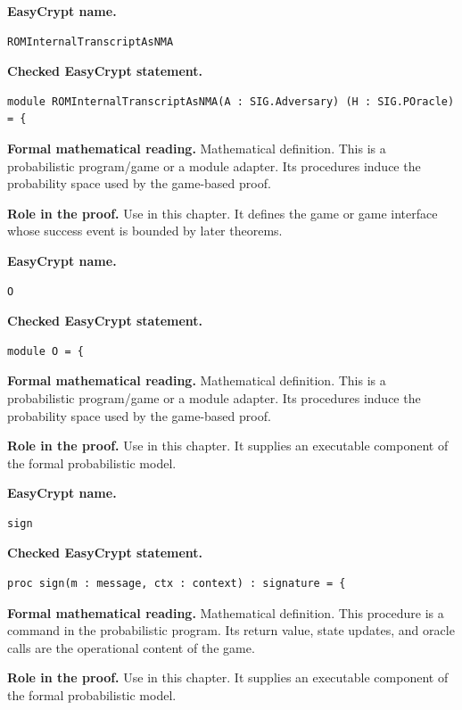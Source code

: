 \begin{formaldefinition}
\noindent\textbf{EasyCrypt name.}
\begin{lstlisting}[language=EasyCrypt,basicstyle=\ttfamily\scriptsize]
ROMInternalTranscriptAsNMA
\end{lstlisting}
\noindent\textbf{Checked EasyCrypt statement.}
\begin{lstlisting}[language=EasyCrypt,basicstyle=\ttfamily\scriptsize]
module ROMInternalTranscriptAsNMA(A : SIG.Adversary) (H : SIG.POracle) = {
\end{lstlisting}
\noindent\textbf{Formal mathematical reading.}
Mathematical definition. This is a probabilistic program/game or a module adapter.  Its procedures induce the probability space used by the game-based proof.

\noindent\textbf{Role in the proof.}
Use in this chapter. It defines the game or game interface whose success event is bounded by later theorems.

\end{formaldefinition}

\begin{formaldefinition}
\noindent\textbf{EasyCrypt name.}
\begin{lstlisting}[language=EasyCrypt,basicstyle=\ttfamily\scriptsize]
O
\end{lstlisting}
\noindent\textbf{Checked EasyCrypt statement.}
\begin{lstlisting}[language=EasyCrypt,basicstyle=\ttfamily\scriptsize]
module O = {
\end{lstlisting}
\noindent\textbf{Formal mathematical reading.}
Mathematical definition. This is a probabilistic program/game or a module adapter.  Its procedures induce the probability space used by the game-based proof.

\noindent\textbf{Role in the proof.}
Use in this chapter. It supplies an executable component of the formal probabilistic model.

\end{formaldefinition}

\begin{formaldefinition}
\noindent\textbf{EasyCrypt name.}
\begin{lstlisting}[language=EasyCrypt,basicstyle=\ttfamily\scriptsize]
sign
\end{lstlisting}
\noindent\textbf{Checked EasyCrypt statement.}
\begin{lstlisting}[language=EasyCrypt,basicstyle=\ttfamily\scriptsize]
proc sign(m : message, ctx : context) : signature = {
\end{lstlisting}
\noindent\textbf{Formal mathematical reading.}
Mathematical definition. This procedure is a command in the probabilistic program.  Its return value, state updates, and oracle calls are the operational content of the game.

\noindent\textbf{Role in the proof.}
Use in this chapter. It supplies an executable component of the formal probabilistic model.

\end{formaldefinition}

